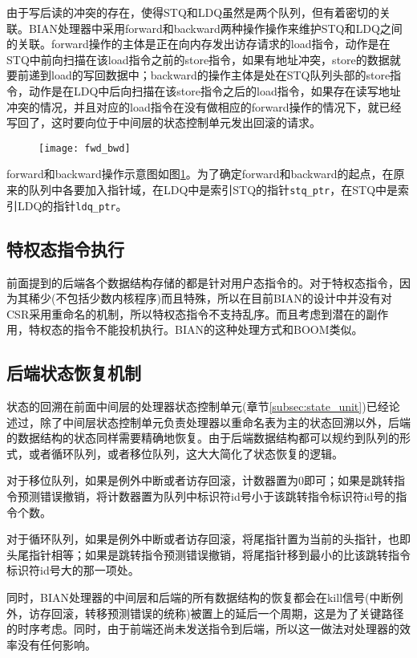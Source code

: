 由于写后读的冲突的存在，使得STQ和LDQ虽然是两个队列，但有着密切的关联。BIAN处理器中采用forward和backward两种操作操作来维护STQ和LDQ之间的关联。forward操作的主体是正在向内存发出访存请求的load指令，动作是在STQ中前向扫描在该load指令之前的store指令，如果有地址冲突，store的数据就要前递到load的写回数据中；backward的操作主体是处在STQ队列头部的store指令，动作是在LDQ中后向扫描在该store指令之后的load指令，如果存在读写地址冲突的情况，并且对应的load指令在没有做相应的forward操作的情况下，就已经写回了，这时要向位于中间层的状态控制单元发出回滚的请求。
\begin{figure}[!htbp]
	\centering
	\texttt{[image: fwd\_bwd]}
	\label{fig:forward_backward}
\end{figure}

forward和backward操作示意图如图\ref{fig:forward_backward}。为了确定forward和backward的起点，在原来的队列中各要加入指针域，在LDQ中是索引STQ的指针\texttt{stq\_ptr}，在STQ中是索引LDQ的指针\texttt{ldq\_ptr}。

\subsection{特权态指令执行}
前面提到的后端各个数据结构存储的都是针对用户态指令的。对于特权态指令，因为其稀少(不包括少数内核程序)而且特殊，所以在目前BIAN的设计中并没有对CSR采用重命名的机制，所以特权态指令不支持乱序。而且考虑到潜在的副作用，特权态的指令不能投机执行。BIAN的这种处理方式和BOOM类似。
\subsection{后端状态恢复机制}
状态的回溯在前面中间层的处理器状态控制单元(章节\ref{subsec:state_unit})已经论述过，除了中间层状态控制单元负责处理器以重命名表为主的状态回溯以外，后端的数据结构的状态同样需要精确地恢复。由于后端数据结构都可以规约到队列的形式，或者循环队列，或者移位队列，这大大简化了状态恢复的逻辑。

对于移位队列，如果是例外中断或者访存回滚，计数器置为0即可；如果是跳转指令预测错误撤销，将计数器置为队列中标识符id号小于该跳转指令标识符id号的指令个数。

对于循环队列，如果是例外中断或者访存回滚，将尾指针置为当前的头指针，也即头尾指针相等；如果是跳转指令预测错误撤销，将尾指针移到最小的比该跳转指令标识符id号大的那一项处。

同时，BIAN处理器的中间层和后端的所有数据结构的恢复都会在kill信号(中断例外，访存回滚，转移预测错误的统称)被置上的延后一个周期，这是为了关键路径的时序考虑。同时，由于前端还尚未发送指令到后端，所以这一做法对处理器的效率没有任何影响。


